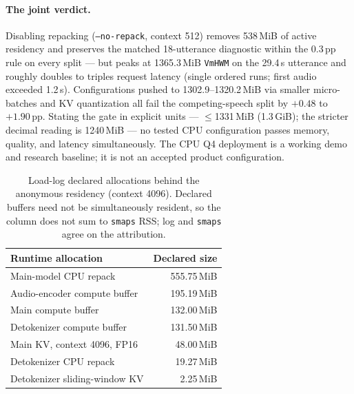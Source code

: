 \documentclass[10pt,twocolumn,letterpaper]{article}
\begin{document}
\paragraph{The joint verdict.}
Disabling repacking (\texttt{--no-repack}, context 512) removes 538\,MiB of
active residency and preserves the matched 18-utterance diagnostic within the
0.3\,pp rule on every split --- but peaks at 1365.3\,MiB \texttt{VmHWM} on the
29.4\,s utterance and roughly doubles to triples request latency (single
ordered runs; first audio exceeded 1.2\,s). Configurations pushed to
1302.9--1320.2\,MiB via smaller micro-batches and KV quantization all fail the
competing-speech split by $+0.48$ to $+1.90$\,pp. Stating the gate in explicit
units --- $\leq$1331\,MiB (1.3\,GiB); the stricter decimal reading is
1240\,MiB --- no tested CPU configuration passes memory, quality, and latency
simultaneously. The CPU Q4 deployment is a working demo and research baseline;
it is not an accepted product configuration.

\begin{table}[t]
\centering
\footnotesize
\setlength{\tabcolsep}{4pt}
\caption{Load-log declared allocations behind the anonymous residency
(context 4096). Declared buffers need not be simultaneously resident, so the
column does not sum to \texttt{smaps} RSS; log and \texttt{smaps} agree on the
attribution.}
\label{tab:attrib}
\begin{tabular}{@{}lr@{}}
\toprule
\textbf{Runtime allocation} & \textbf{Declared size} \\
\midrule
Main-model CPU repack & 555.75\,MiB \\
Audio-encoder compute buffer & 195.19\,MiB \\
Main compute buffer & 132.00\,MiB \\
Detokenizer compute buffer & 131.50\,MiB \\
Main KV, context 4096, FP16 & 48.00\,MiB \\
Detokenizer CPU repack & 19.27\,MiB \\
Detokenizer sliding-window KV & 2.25\,MiB \\
\bottomrule
\end{tabular}
\end{table}
\end{document}
